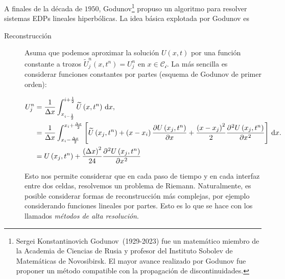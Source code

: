 \begin{frame}
	A finales de la década de $1950$,
	Godunov\footnote{Sergei Konstantinovich Godunov~(1929-2023) fue un
		matemático miembro de la Academia de Ciencias de Rusia y profesor
		del Instituto Sobolev de Matemáticas de Novosibirsk.
		El mayor avance realizado por Godunov fue proponer un método
		compatible con la propagación de discontinuidades.} propuso un
	algoritmo para resolver sistemas EDPs lineales hiperbólicas.
	La idea básica explotada por Godunov es

	\begin{description}
		\item[Reconstrucción]

		      Asuma que podemos aproximar la solución
		      \begin{math}
			      U
			      \left(x,t\right)
		      \end{math}
		      por una función constante a trozos
		      \begin{math}
			      \widetilde{U}^{n}_{j}
			      \left(x,t^{n}\right)=
			      U^{n}_{j}
		      \end{math}
		      en $x\in\mathcal{C_{i}}$.
		      La más sencilla es considerar funciones constantes por partes
		      (esquema de Godunov de primer orden):

		      \begin{align*}
			      U^{n}_{j}
			       & =
			      \frac{1}{\Delta x}
			      \int_{x_{i-\frac{1}{2}}}^{i+\frac{1}{2}}
			      \widetilde{U}
			      \left(x,t^{n}\right)
			      \dl x, \\
			       & =
			      \frac{1}{\Delta x}
			      \int_{x_{i}-\frac{\Delta x}{2}}^{x_{i}+\frac{\Delta x}{2}}
			      \left[
				      \widetilde{U}
				      \left(x_{j},t^{n}\right)+
				      \left(x-x_{i}\right)
				      \diffp{U\left(x_{j},t^{n}\right)}{x}+
				      \frac{{\left(x-x_{j}\right)}^{2}}{2}
				      \diffp[2]{U\left(x_{j},t^{n}\right)}{x}
				      \right]
			      \dl x. \\
			       & =
			      U\left(x_{j},t^{n}\right)+
			      \frac{{\left(\Delta x\right)}^{2}}{24}
			      \diffp[2]{U\left(x_{j},t^{n}\right)}{x}
		      \end{align*}

		      Esto nos permite considerar que en cada paso de tiempo y en cada interfaz entre dos celdas,
		      resolvemos un problema de Riemann.
		      Naturalmente, es posible considerar formas de reconstrucción más complejas,
		      por ejemplo considerando funciones lineales por partes.
		      Esto es lo que se hace con los llamados \emph{métodos de alta resolución}.


\end{description}
\end{frame}
